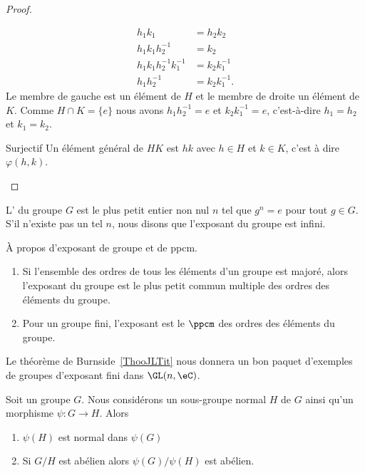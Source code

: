 \begin{proof}
\begin{subproof}
\begin{subproof}
\begin{subequations}
\begin{align}
					h_1k_1                 & =h_2k_2       \\
					h_1 k_1 h_2^{-1}       & =k_2          \\
					h_1k_1h_2^{-1}k_1^{-1} & =k_2k_1^{-1}  \\
					h_1h_2^{-1}            & =k_2k_1^{-1}.
				\end{align}
			\end{subequations}
			Le membre de gauche est un élément de \( H\) et le membre de droite un élément de \( K\). Comme \( H\cap K=\{ e \}\) nous avons \( h_1h_2^{-1}=e\) et \( k_2k_1^{-1}=e\), c'est-à-dire \( h_1=h_2\) et \( k_1=k_2\).
			\item[Surjectif]
			Un élément général de \( HK\) est \( hk\) avec \( h\in H\) et \( k\in K\), c'est à dire \( \varphi(h,k)\).
		\end{subproof}
	\end{subproof}
\end{proof}

\begin{definition}  \label{DefvtSAyb}
	L' du groupe \( G\) est le plus petit entier non nul \( n\) tel que \( g^n=e\) pour tout \( g\in G\). S'il n'existe pas un tel \( n\), nous disons que l'exposant du groupe est infini.
\end{definition}

\begin{proposition} \label{PROPooSWHHooOzqWkw}
    À propos d'exposant de groupe et de ppcm.
	\begin{enumerate}
		\item
		      Si l'ensemble des ordres de tous les éléments d'un groupe est majoré, alors l'exposant du groupe est le plus petit commun multiple des ordres des éléments du groupe.
		\item
		      Pour un groupe fini, l'exposant est le \( \ppcm\) des ordres des éléments du groupe.
	\end{enumerate}
\end{proposition}

Le théorème de Burnside~\ref{ThooJLTit} nous donnera un bon paquet d'exemples de groupes d'exposant fini dans \( \GL(n,\eC)\).

\begin{proposition} \label{PropSRMJooIDPBoW}
	Soit un groupe \( G\). Nous considérons un sous-groupe normal \( H\) de \( G\) ainsi qu'un morphisme \( \psi\colon G\to H\). Alors
	\begin{enumerate}
		\item
		      \( \psi(H)\) est normal dans \( \psi(G)\)
		\item
		      Si \( G/H\) est abélien alors \( \psi(G)/\psi(H)\) est abélien.
	\end{enumerate}
\end{proposition}

